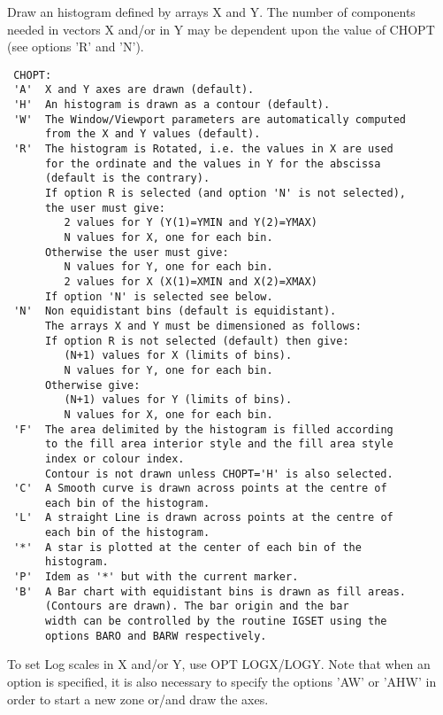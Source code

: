 \BEGARG
{}
\ENDARG
\BEGTEXT
Draw an histogram defined by arrays X and Y.
The number of components
needed in vectors X and/or in Y may be dependent upon the value of CHOPT
(see options 'R' and 'N').
\begin{verbatim}
 CHOPT:
 'A'  X and Y axes are drawn (default).
 'H'  An histogram is drawn as a contour (default).
 'W'  The Window/Viewport parameters are automatically computed
      from the X and Y values (default).
 'R'  The histogram is Rotated, i.e. the values in X are used
      for the ordinate and the values in Y for the abscissa
      (default is the contrary).
      If option R is selected (and option 'N' is not selected),
      the user must give:
         2 values for Y (Y(1)=YMIN and Y(2)=YMAX)
         N values for X, one for each bin.
      Otherwise the user must give:
         N values for Y, one for each bin.
         2 values for X (X(1)=XMIN and X(2)=XMAX)
      If option 'N' is selected see below.
 'N'  Non equidistant bins (default is equidistant).
      The arrays X and Y must be dimensioned as follows:
      If option R is not selected (default) then give:
         (N+1) values for X (limits of bins).
         N values for Y, one for each bin.
      Otherwise give:
         (N+1) values for Y (limits of bins).
         N values for X, one for each bin.
 'F'  The area delimited by the histogram is filled according
      to the fill area interior style and the fill area style
      index or colour index.
      Contour is not drawn unless CHOPT='H' is also selected.
 'C'  A Smooth curve is drawn across points at the centre of
      each bin of the histogram.
 'L'  A straight Line is drawn across points at the centre of
      each bin of the histogram.
 '*'  A star is plotted at the center of each bin of the
      histogram.
 'P'  Idem as '*' but with the current marker.
 'B'  A Bar chart with equidistant bins is drawn as fill areas.
      (Contours are drawn). The bar origin and the bar
      width can be controlled by the routine IGSET using the
      options BARO and BARW respectively.
\end{verbatim}
To set Log scales in X and/or Y, use OPT LOGX/LOGY.
Note that when an option is specified, it is also necessary to
specify the options 'AW' or 'AHW' in order to start a new zone
or/and draw the axes.
\ENDTEXT

